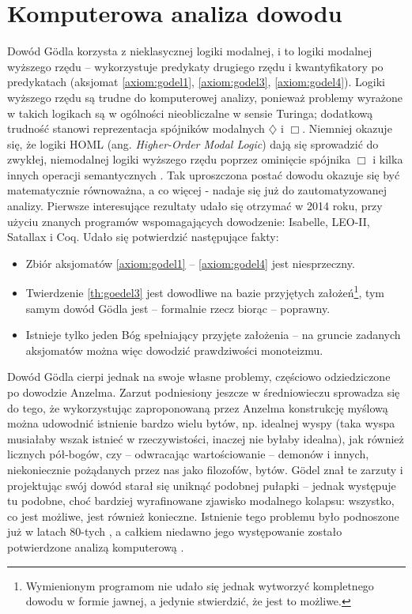\documentclass{eiti-raport}
\begin{document}
\section{Komputerowa analiza dowodu}
Dowód G\"odla korzysta z nieklasycznej logiki modalnej, i to logiki modalnej wyższego rzędu -- wykorzystuje predykaty drugiego rzędu i kwantyfikatory po predykatach (aksjomat \ref{axiom:godel1}, \ref{axiom:godel3}, \ref{axiom:godel4}). Logiki wyższego rzędu są trudne do komputerowej analizy, ponieważ problemy wyrażone w takich logikach są w ogólności nieobliczalne w sensie Turinga; dodatkową trudność stanowi reprezentacja spójników modalnych $\diamondsuit$ i $\Box$. Niemniej okazuje się, że logiki HOML (ang. \textit{Higher-Order Modal Logic}) dają się sprowadzić do zwykłej, niemodalnej logiki wyższego rzędu poprzez ominięcie spójnika $\Box$ i kilka innych operacji semantycznych \cite{benzmuller2014}. Tak uproszczona postać dowodu okazuje się być matematycznie równoważna, a co więcej - nadaje się już do zautomatyzowanej analizy. Pierwsze interesujące rezultaty udało się otrzymać w 2014 roku, przy użyciu znanych programów wspomagających dowodzenie: Isabelle, LEO-II, Satallax i Coq. Udało się potwierdzić następujące fakty:
\begin{itemize}
	\item Zbiór aksjomatów \ref{axiom:godel1} -- \ref{axiom:godel4} jest niesprzeczny. 
	\item Twierdzenie \ref{th:goedel3} jest dowodliwe na bazie przyjętych założeń\footnote{Wymienionym programom nie udało się jednak wytworzyć kompletnego dowodu w formie jawnej, a jedynie stwierdzić, że jest to możliwe. }, tym samym dowód G\"odla jest -- formalnie rzecz biorąc -- poprawny.
	\item Istnieje tylko jeden Bóg spełniający przyjęte założenia -- na  gruncie zadanych aksjomatów można więc dowodzić prawdziwości monoteizmu. 
\end{itemize}

Dowód G\"odla cierpi jednak na swoje własne problemy, częściowo odziedziczone po dowodzie Anzelma. Zarzut podniesiony jeszcze w średniowieczu sprowadza się do tego, że wykorzystując zaproponowaną przez Anzelma konstrukcję myślową można udowodnić istnienie bardzo wielu bytów, np. idealnej wyspy (taka wyspa musiałaby wszak istnieć w rzeczywistości, inaczej nie byłaby idealna), jak również licznych pół-bogów, czy -- odwracając wartościowanie -- demonów i innych, niekoniecznie pożądanych przez nas jako filozofów, bytów. G\"odel znał te zarzuty i projektując swój dowód starał się uniknąć podobnej pułapki -- jednak występuje tu podobne, choć bardziej wyrafinowane zjawisko modalnego kolapsu: wszystko, co jest możliwe, jest również konieczne. Istnienie tego problemu było podnoszone już w latach 80-tych \cite{sobel1987}, a całkiem niedawno jego występowanie zostało potwierdzone analizą komputerową \cite{benzmuller2014}. 
\end{document}

